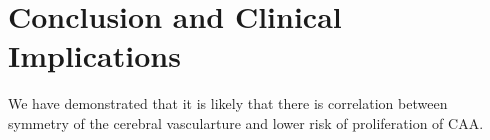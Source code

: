 \documentclass[12pt]{article} %
\theoremstyle{definition}
\begin{document}



\section{Conclusion and Clinical Implications}

We have demonstrated that it is likely that there is correlation between symmetry of the cerebral vascularture and lower risk of proliferation of CAA.  


%

{}
\end{document}
